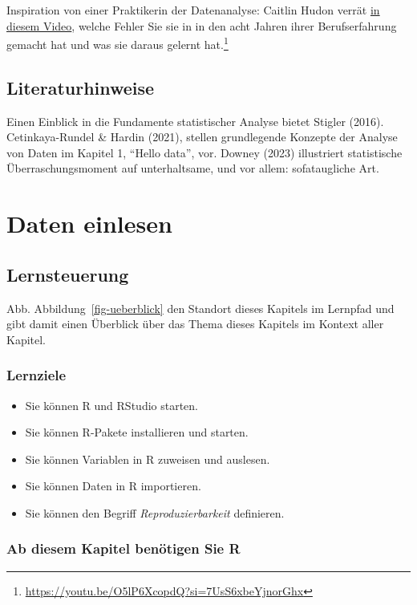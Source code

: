 \documentclass[
  letterpaper,
]{scrbook}
\providecommand{\tightlist}{%
  \setlength{\itemsep}{0pt}\setlength{\parskip}{0pt}}\usepackage{longtable,booktabs,array}
\theoremstyle{definition}
\theoremstyle{definition}
\theoremstyle{definition}
\theoremstyle{remark}
\begin{document}
Inspiration von einer Praktikerin der Datenanalyse: Caitlin Hudon verrät
\href{https://www.youtube.com/watch?v=O5lP6XcopdQ&list=PL9HYL-VRX0oQchs7dqFICoxMgnvFO10tC&index=15&t=1s}{in
diesem Video}, welche Fehler Sie sie in in den acht Jahren ihrer
Berufserfahrung gemacht hat und was sie daraus gelernt hat.\footnote{\url{https://youtu.be/O5lP6XcopdQ?si=7UsS6xbeYjnorGhx}}

\section{Literaturhinweise}\label{literaturhinweise}

Einen Einblick in die Fundamente statistischer Analyse bietet Stigler
(2016). Cetinkaya-Rundel \& Hardin (2021), stellen grundlegende Konzepte
der Analyse von Daten im Kapitel 1, ``Hello data'', vor. Downey (2023)
illustriert statistische Überraschungsmoment auf unterhaltsame, und vor
allem: sofataugliche Art.

\chapter{Daten einlesen}\label{daten-einlesen}

\section{Lernsteuerung}\label{lernsteuerung-1}

Abb. Abbildung~\ref{fig-ueberblick} den Standort dieses Kapitels im
Lernpfad und gibt damit einen Überblick über das Thema dieses Kapitels
im Kontext aller Kapitel.

\subsection{Lernziele}\label{lernziele-2}

\begin{itemize}
\tightlist
\item
  Sie können R und RStudio starten.
\item
  Sie können R-Pakete installieren und starten.
\item
  Sie können Variablen in R zuweisen und auslesen.
\item
  Sie können Daten in R importieren.
\item
  Sie können den Begriff \emph{Reproduzierbarkeit} definieren.
\end{itemize}

\subsection{Ab diesem Kapitel benötigen Sie
R}\label{ab-diesem-kapitel-benuxf6tigen-sie-r}
\end{document}
